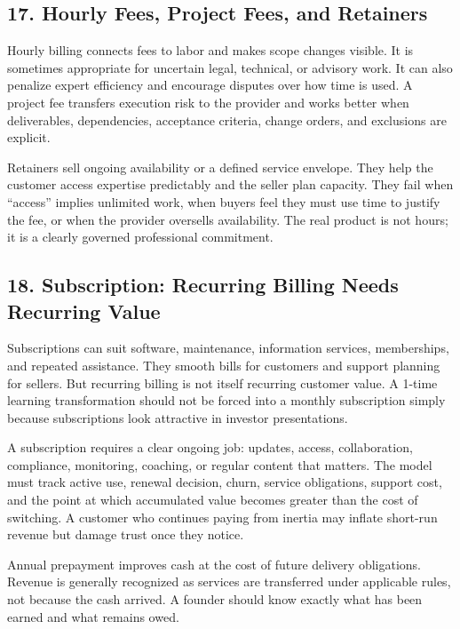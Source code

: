 \subsection*{17. Hourly Fees, Project Fees, and Retainers}

Hourly billing connects fees to labor and makes scope changes visible. It is sometimes appropriate for uncertain legal, technical, or advisory work. It can also penalize expert efficiency and encourage disputes over how time is used. A project fee transfers execution risk to the provider and works better when deliverables, dependencies, acceptance criteria, change orders, and exclusions are explicit.

Retainers sell ongoing availability or a defined service envelope. They help the customer access expertise predictably and the seller plan capacity. They fail when ``access'' implies unlimited work, when buyers feel they must use time to justify the fee, or when the provider oversells availability. The real product is not hours; it is a clearly governed professional commitment.

\subsection*{18. Subscription: Recurring Billing Needs Recurring Value}

Subscriptions can suit software, maintenance, information services, memberships, and repeated assistance. They smooth bills for customers and support planning for sellers. But recurring billing is not itself recurring customer value. A 1-time learning transformation should not be forced into a monthly subscription simply because subscriptions look attractive in investor presentations.

A subscription requires a clear ongoing job: updates, access, collaboration, compliance, monitoring, coaching, or regular content that matters. The model must track active use, renewal decision, churn, service obligations, support cost, and the point at which accumulated value becomes greater than the cost of switching. A customer who continues paying from inertia may inflate short-run revenue but damage trust once they notice.

Annual prepayment improves cash at the cost of future delivery obligations. Revenue is generally recognized as services are transferred under applicable rules, not because the cash arrived. A founder should know exactly what has been earned and what remains owed.


